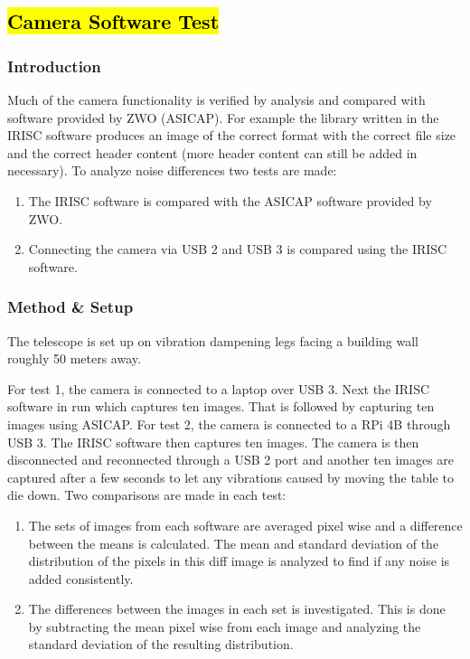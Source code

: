 \subsection{\hl{Camera Software Test}}
\label{app:camera_software_test}
\subsubsection*{Introduction}

Much of the camera functionality is verified by analysis and compared with software provided by ZWO (ASICAP). For example the library written in the IRISC software produces an image of the correct format with the correct file size and the correct header content (more header content can still be added in necessary). To analyze noise differences two tests are made:

\begin{enumerate}
    \item The IRISC software is compared with the ASICAP software provided by ZWO.
    \item Connecting the camera via USB 2 and USB 3 is compared using the IRISC software.
\end{enumerate}

\subsubsection*{Method \& Setup}

The telescope is set up on vibration dampening legs facing a building wall roughly 50 meters away.

For test 1, the camera is connected to a laptop over USB 3. Next the IRISC software in run which captures ten images. That is followed by capturing ten images using ASICAP.  For test 2, the camera is connected to a RPi 4B through USB 3. The IRISC software then captures ten images. The camera is then disconnected and reconnected through a USB 2 port and another ten images are captured after a few seconds to let any vibrations caused by moving the table to die down. Two comparisons are made in each test:

\begin{enumerate}
    \item The sets of images from each software are averaged pixel wise and a difference between the means is calculated. The mean and standard deviation of the distribution of the pixels in this diff image is analyzed to find if any noise is added consistently. 

    \item The differences between the images in each set is investigated.  This is done by subtracting the mean pixel wise from each image and analyzing the standard deviation of the resulting distribution.
\end{enumerate}

